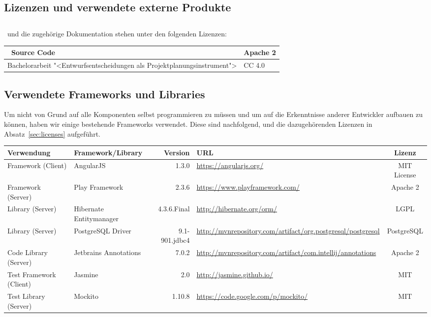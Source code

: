 \begin{landscape}
\chapter{Lizenzen und verwendete externe Produkte}
	\section{\eeppi}
	\label{sec:eeppiLisences}
		
	\eeppi\ und die zugehörige Dokumentation stehen unter den folgenden Lizenzen:
	\vspace{0.5cm}
	
	\noindent
	\begin{tabularx}{\linewidth}{|l|X|}
		\hline
		\eeppi\ Source Code & Apache 2\\
		\hline
		Bachelorarbeit "<Entwurfsentscheidungen als Projektplanungsinstrument"> & CC 4.0\\
		\hline
	\end{tabularx}
	

	\section{Verwendete Frameworks und Libraries}
	\label{sec:usedLibrariesAndFrameworks}
	Um nicht von Grund auf alle Komponenten selbst programmieren zu müssen 
	und um auf die Erkenntnisse anderer Entwickler aufbauen zu können,
	haben wir einige bestehende Frameworks verwendet.
	Diese sind nachfolgend, und die dazugehörenden Lizenzen in Absatz~\ref{sec:licenses} aufgeführt.
	
	\vspace{0.5cm}
	
	\newcommand{\addLib}[5]{
		#5 & #1 & #2 & \url{#3} & #4 \\
		\hline
	}
	
	\noindent
	\begin{tabularx}{\linewidth}{| l | l r | X | c |}
		\hline
		\textbf{Verwendung} & \textbf{Framework/Library} & \textbf{Version} & \textbf{URL} & \textbf{Lizenz} \\
		\hline \hline
		\addLib{AngularJS}{1.3.0}{https://angularjs.org/}{MIT License}{Framework (Client)}
		\addLib{Play Framework}{2.3.6}{https://www.playframework.com/}{Apache 2}{Framework (Server)}
		\addLib{Hibernate Entitymanager}{4.3.6.Final}{http://hibernate.org/orm/}{LGPL}{Library (Server)}
		\addLib{PostgreSQL Driver}{9.1-901.jdbc4}{http://mvnrepository.com/artifact/org.postgresql/postgresql}{PostgreSQL}{Library (Server)}
		\addLib{Jetbrains Annotations}{7.0.2}{http://mvnrepository.com/artifact/com.intellij/annotations}{Apache 2}{Code Library (Server)}
		\addLib{Jasmine}{2.0}{http://jasmine.github.io/}{MIT}{Test Framework (Client)}
		\addLib{Mockito}{1.10.8}{https://code.google.com/p/mockito/}{MIT}{Test Library (Server)}
	\end{tabularx}
		

\end{landscape}
